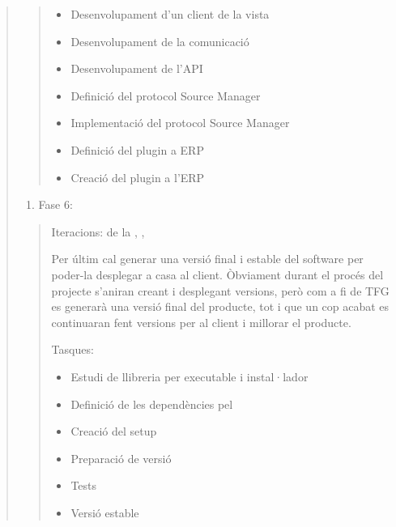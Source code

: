 \documentclass[letterpaper,11pt,catalan]{sphinxmanual}
\begin{document}
\begin{quote}
\begin{quote}
\begin{itemize}
\item {} 
Desenvolupament d'un client de la vista

\item {} 
Desenvolupament de la comunicació

\item {} 
Desenvolupament de l'API

\item {} 
Definició del protocol Source Manager

\item {} 
Implementació del protocol Source Manager

\item {} 
Definició del plugin a ERP

\item {} 
Creació del plugin a l'ERP

\end{itemize}
\end{quote}
\begin{enumerate}
\item {} 
Fase 6:

\end{enumerate}
\begin{quote}

Iteracions: de la , , 

Per últim cal generar una versió final i estable del software per poder-la desplegar a
casa al client. Òbviament durant el procés del projecte s'aniran creant i desplegant
versions, però com a fi de TFG es generarà una versió final del producte, tot i
que un cop acabat es continuaran fent versions per al client i millorar el producte.

Tasques:
\begin{itemize}
\item {} 
Estudi de llibreria per executable i instal·lador

\item {} 
Definició de les dependències pel

\item {} 
Creació del setup

\item {} 
Preparació de versió

\item {} 
Tests

\item {} 
Versió estable

\end{itemize}
\end{quote}
\end{quote}
\end{document}
